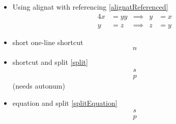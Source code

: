 \documentclass{article}
\def\ifautonum#1{#1}%
\def\ifautonum#1{}%
\begin{document}
\begin{itemize}
		\item Using alignat with referencing \ref{alignatReferenced}
			\begin{alignat}{4}
				x &= yy & \implies & y &= x \label{alignatUnreferenced}\\
				y &= z & \implies & z &= y \label{alignatReferenced}
			\end{alignat}
		\item short one-line shortcut \[n\]
		\ifautonum{
			\item align, numbering always \begin{align+} a=l \end{align+} (needs autonum)
			\item gather, numbering always \begin{gather+} g=a \end{gather+} (needs autonum)
			\item multline, numbering always (and avoiding overfull hbox warning) \begin{multline+} m=u\line(1,0){220}=v \end{multline+} (needs autonum)
			\item equation, numbering always \begin{equation+} e=q \end{equation+} (needs autonum)
		}
		\item shortcut and split \ref{split} \[ \label{split}\begin{split} s \\ p \end{split} \] (needs autonum)
		\item equation and split \ref{splitEquation} \begin{equation} \label{splitEquation}\begin{split} s \\ p \end{split} \end{equation}

\end{itemize}
\end{document}
